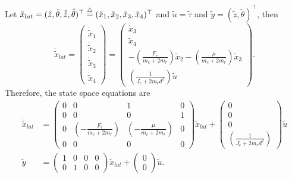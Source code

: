 Let $\tilde{x}_{lat} = (\tilde{z}, \tilde{\theta}, \dot{\tilde{z}}, \dot{\tilde{\theta}})^{\top} \stackrel{\triangle}{=} (\tilde{x}_1, \tilde{x}_2, \tilde{x}_3, \tilde{x}_4)^{\top}$ and $\tilde{u}=\tilde{\tau}$ and $\tilde{y}=(\tilde{z},\tilde{\theta})^{\top}$, then
\[
\dot{\tilde{x}}_{lat} = \begin{pmatrix} \dot{\tilde{x}}_1 \\ \dot{\tilde{x}}_2 \\ \dot{\tilde{x}}_3 \\ \dot{\tilde{x}}_4 \end{pmatrix} 
	= \begin{pmatrix} \tilde{x}_3 \\ \tilde{x}_4 \\ -\left(\frac{F_e}{m_c+2m_r}\right)\tilde{x}_2 - \left(\frac{\mu}{m_c+2m_r}\right)\tilde{x}_3 \\ \left(\frac{1}{J_c+2m_rd^2}\right) \tilde{u} \end{pmatrix}.
\]
Therefore, the state space equations are
\begin{align*}
\dot{\tilde{x}}_{lat} &= \begin{pmatrix} 0 & 0 & 1 & 0\\ 0 & 0 & 0 & 1 \\ 0 & \left(-\frac{F_e}{m_c+2m_r}\right) & \left(-\frac{\mu}{m_c+2m_r}\right) & 0 \\ 0 & 0 & 0 & 0 \end{pmatrix} \tilde{x}_{lat} + \begin{pmatrix} 0 \\ 0 \\ 0 \\ \left(\frac{1}{J_c+2m_rd^2}\right) \end{pmatrix} \tilde{u} \\
\tilde{y} &= \begin{pmatrix} 1 & 0 & 0 & 0 \\ 0 & 1 & 0 & 0 \end{pmatrix} \tilde{x}_{lat}  + \begin{pmatrix} 0 \\ 0 \end{pmatrix} \tilde{u}.
\end{align*}

